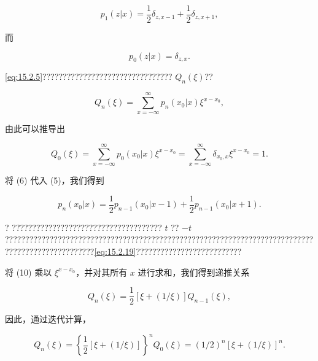 \begin{equation}\tag{15.2.6}\label{eq:15.2.6}
p _ { 1 } ( z | x ) = \frac { 1 } { 2 } \delta _ { z , x - 1 } + \frac { 1 } { 2 } \delta _ { z , x + 1 } ,
\end{equation}

而

\begin{equation}\tag{15.2.7}\label{eq:15.2.7}
p _ { 0 } ( z | x ) = \delta _ { z , x } .
\end{equation}

\autoref{eq:15.2.5}???????????????????????????????? \(Q_{n}(\xi)\)??

\begin{equation}\tag{15.2.8}\label{eq:15.2.8}
Q _ { n } ( \xi ) = \sum _ { x = - \infty } ^{\infty} p _ { n } ( x _ { 0 } | x ) \xi ^{x - x _ { 0} } ,
\end{equation}

由此可以推导出

\begin{equation}\tag{15.2.9}\label{eq:15.2.9}
Q _ { 0 } ( \xi ) = \sum _ { x = - \infty } ^{\infty} p _ { 0 } ( x _ { 0 } | x ) \xi ^{x - x _ { 0} } = \sum _ { x = - \infty } ^{\infty} \delta _ { x _ { 0 } , x } \xi ^{x - x _ { 0} } = 1 .
\end{equation}

将 (6) 代入 (5)，我们得到

\begin{equation}\tag{15.2.10}\label{eq:15.2.10}
p _ { n } ( x _ { 0 } | x ) = \frac { 1 } { 2 } p _ { n - 1 } ( x _ { 0 } | x - 1 ) + \frac { 1 } { 2 } p _ { n - 1 } ( x _ { 0 } | x + 1 ) .
\end{equation}

? ????????????????????????????????????? \(t\) ?? \(-t\) ??????????????????????????????????????????????????????????????????????????????????????????????????\autoref{eq:15.2.19}??????????????????????????

将 (10) 乘以 \(\xi^{x-x_0}\)，并对其所有 \(x\) 进行求和，我们得到递推关系

\begin{equation}\tag{15.2.11}\label{eq:15.2.11}
Q _ { n } ( \xi ) = \frac { 1 } { 2 } [ \xi + ( 1 / \xi ) ] Q _ { n - 1 } ( \xi ) ,
\end{equation}

因此，通过迭代计算，

\begin{equation}\tag{15.2.12}\label{eq:15.2.12}
Q _ { n } ( \xi ) = \left\{ \frac { 1 } { 2 } [ \xi + ( 1 / \xi ) ] \right\} ^{n} Q _ { 0 } ( \xi ) = ( 1 / 2 ) ^{n} [ \xi + ( 1 / \xi ) ] ^{n} .
\end{equation}

